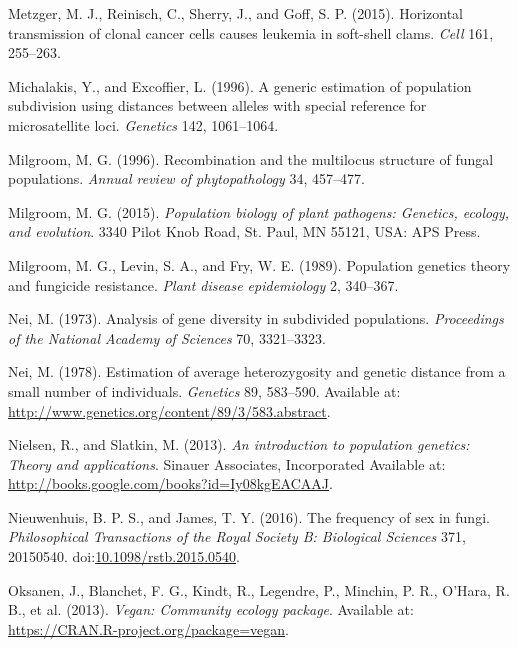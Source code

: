 \documentclass[double,12pt]{beavtex}
\begin{document}
  \hypertarget{ref-metzger2015horizontal}{}
  Metzger, M. J., Reinisch, C., Sherry, J., and Goff, S. P. (2015).
  Horizontal transmission of clonal cancer cells causes leukemia in
  soft-shell clams. \emph{Cell} 161, 255--263.
  
  \hypertarget{ref-michalakis1996generic}{}
  Michalakis, Y., and Excoffier, L. (1996). A generic estimation of
  population subdivision using distances between alleles with special
  reference for microsatellite loci. \emph{Genetics} 142, 1061--1064.
  
  \hypertarget{ref-milgroom1996recombination}{}
  Milgroom, M. G. (1996). Recombination and the multilocus structure of
  fungal populations. \emph{Annual review of phytopathology} 34, 457--477.
  
  \hypertarget{ref-milgroom2015population}{}
  Milgroom, M. G. (2015). \emph{Population biology of plant pathogens:
  Genetics, ecology, and evolution}. 3340 Pilot Knob Road, St. Paul, MN
  55121, USA: APS Press.
  
  \hypertarget{ref-milgroom1989population}{}
  Milgroom, M. G., Levin, S. A., and Fry, W. E. (1989). Population
  genetics theory and fungicide resistance. \emph{Plant disease
  epidemiology} 2, 340--367.
  
  \hypertarget{ref-nei1973analysis}{}
  Nei, M. (1973). Analysis of gene diversity in subdivided populations.
  \emph{Proceedings of the National Academy of Sciences} 70, 3321--3323.
  
  \hypertarget{ref-Nei:1978}{}
  Nei, M. (1978). Estimation of average heterozygosity and genetic
  distance from a small number of individuals. \emph{Genetics} 89,
  583--590. Available at:
  \url{http://www.genetics.org/content/89/3/583.abstract}.
  
  \hypertarget{ref-nielsen2013introduction}{}
  Nielsen, R., and Slatkin, M. (2013). \emph{An introduction to population
  genetics: Theory and applications}. Sinauer Associates, Incorporated
  Available at: \url{http://books.google.com/books?id=Iy08kgEACAAJ}.
  
  \hypertarget{ref-nieuwenhuis2016frequency}{}
  Nieuwenhuis, B. P. S., and James, T. Y. (2016). The frequency of sex in
  fungi. \emph{Philosophical Transactions of the Royal Society B:
  Biological Sciences} 371, 20150540.
  doi:\href{https://doi.org/10.1098/rstb.2015.0540}{10.1098/rstb.2015.0540}.
  
  \hypertarget{ref-oksanen2013vegan}{}
  Oksanen, J., Blanchet, F. G., Kindt, R., Legendre, P., Minchin, P. R.,
  O'Hara, R. B., et al. (2013). \emph{Vegan: Community ecology package}.
  Available at: \url{https://CRAN.R-project.org/package=vegan}.
  
\end{document}
